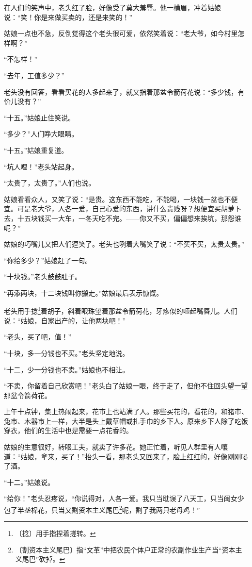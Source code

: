 \documentclass[12pt,UTF-8,openany]{ctexbook}
\begin{document}
\begin{large}
    在人们的笑声中，老头红了脸，好像受了莫大羞辱。他一横眉，冲着姑娘说：“笑！你是来做买卖的，还是来笑的！”
    
    姑娘一点也不急，反倒觉得这个老头很可爱，依然笑着说：“老大爷，如今村里怎样啊？”
    
    “不怎样！”
    
    “去年，工值多少？”
    
    老头没有回答，看看买花的人多起来了，就又指着那盆令箭荷花说：“多少钱，有价儿没有？”
    
    “十五。”姑娘止住笑说。
    
    “多少？”人们睁大眼睛。
    
    “十五。”姑娘重复道。
    
    “坑人哩！”老头站起身。
    
    “太贵了，太贵了。”人们也说。
    
    姑娘看看众人，又笑了说：“是贵。这东西不能吃，不能喝，一块钱一盆也不便宜。可是老大爷，人各一爱，自己心爱的东西，讲什么贵贱呀？想便宜买胡萝卜去，十五块钱买一大车，一冬天吃不完。——你又不买，偏偏想来挨坑，那怨谁呢？”
    
    姑娘的巧嘴儿又把人们逗笑了。老头也咧着大嘴笑了说：“不买不买，太贵太贵。”
    
    “你给多少？”姑娘赶了一句。
    
    “十块钱。”老头鼓鼓肚子。
    
    “再添两块，十二块钱叫你搬走。”姑娘最后表示慷慨。
    
    老头用手捻\footnote{〔捻〕用手指捏着搓转。}着胡子，斜着眼珠望着那盆令箭荷花，牙疼似的咂起嘴唇儿。人们说：“姑娘，自家出产的，让他两块吧！”
    
    “老头，买了吧，值！”
    
    “十块，多一分钱也不买。”老头坚定地说。
    
    “十二，少一分钱也不卖。”姑娘也不相让。
    
    “不卖，你留着自己欣赏吧！”老头白了姑娘一眼，终于走了，但他不住回头望一望那盆令箭荷花。
    
    上午十点钟，集上热闹起来，花市上也站满了人。那些买花的，看花的，和猪市、兔市、木器市上一样，大半是头上戴草帽或扎手巾的乡下人。原来乡下人除了吃饭穿衣，他们的生活中也是需要一点花香的。
    
    姑娘的生意很好，转眼工夫，就卖了许多花。她正忙着，听见人群里有人嚷道：“姑娘，拿来，买了！”抬头一看，那老头又回来了，脸上红红的，好像刚刚喝了酒。
    
    “十二。”姑娘说。
    
    “给你！”老头忍疼说，“你说得对，人各一爱。我只当耽误了八天工，只当闺女少包了半垄棉花，只当又割资本主义尾巴\footnote{〔割资本主义尾巴〕指“文革”中把农民个体户正常的农副作业生产当“资本主义尾巴”砍掉。}呢，割了我两只老母鸡！”
    

\end{large}
\end{document}
